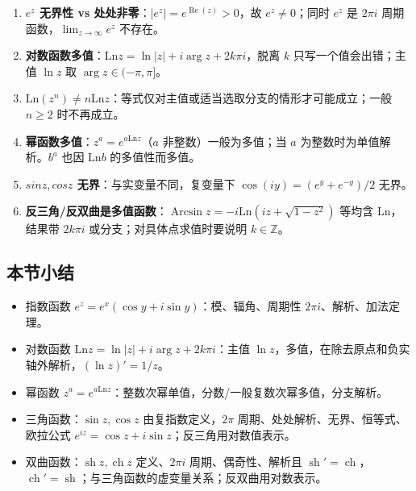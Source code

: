 \begin{enumerate}
\def\labelenumi{\arabic{enumi}.}
\tightlist
\item
  \textbf{\(e^z\) 无界性 vs
  处处非零}：\(|e^z|=e^{\operatorname{Re}(z)}>0\)，故 \(e^z\neq0\)；同时
  \(e^z\) 是 \(2\pi i\) 周期函数，\(\lim_{z\to\infty}e^z\) 不存在。
\item
  \textbf{对数函数多值}：\(\mathrm{Ln}z=\ln|z|+i\arg z+2k\pi i\)，脱离
  \(k\) 只写一个值会出错；主值 \(\ln z\) 取 \(\arg z\in(-\pi,\pi]\)。
\item
  \textbf{\(\mathrm{Ln}(z^n)\neq n\mathrm{Ln}z\)}：等式仅对主值或适当选取分支的情形才可能成立；一般
  \(n\ge2\) 时不再成立。
\item
  \textbf{幂函数多值}：\(z^a=e^{a\mathrm{Ln}z}\)（\(a\)
  非整数）一般为多值；当 \(a\) 为整数时为单值解析。\(b^a\) 也因
  \(\mathrm{Ln}b\) 的多值性而多值。
\item
  \textbf{\(sin z,cos z\) 无界}：与实变量不同，复变量下
  \(\cos(iy)=(e^y+e^{-y})/2\) 无界。
\item
  \textbf{反三角/反双曲是多值函数}：\(\operatorname{Arcsin}z=-i\mathrm{Ln}(iz+\sqrt{1-z^2})\)
  等均含 \(\mathrm{Ln}\)，结果带 \(2k\pi i\)
  或分支；对具体点求值时要说明 \(k\in\mathbb{Z}\)。
\end{enumerate}

\subsection{本节小结}\label{ux672cux8282ux5c0fux7ed3-6}

\begin{itemize}
\tightlist
\item
  指数函数 \(e^z=e^x(\cos y+i\sin y)\)：模、辐角、周期性
  \(2\pi i\)、解析、加法定理。
\item
  对数函数 \(\mathrm{Ln}z=\ln|z|+i\arg z+2k\pi i\)：主值
  \(\ln z\)，多值，在除去原点和负实轴外解析，\((\ln z)'=1/z\)。
\item
  幂函数
  \(z^a=e^{a\mathrm{Ln}z}\)：整数次幂单值，分数/一般复数次幂多值，分支解析。
\item
  三角函数：\(\sin z,\cos z\) 由复指数定义，\(2\pi\)
  周期、处处解析、无界、恒等式、欧拉公式
  \(e^{iz}=\cos z+i\sin z\)；反三角用对数值表示。
\item
  双曲函数：\(\operatorname{sh}z,\operatorname{ch}z\) 定义、\(2\pi i\)
  周期、偶奇性、解析且
  \(\operatorname{sh}'=\operatorname{ch}\)，\(\operatorname{ch}'=\operatorname{sh}\)；与三角函数的虚变量关系；反双曲用对数表示。
\end{itemize}

\newpage
